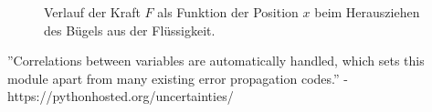 \documentclass[11pt,a4paper]{article}
\begin{document}
\begin{figure}[p]
\centering
{}
\caption{Verlauf der Kraft $F$ als Funktion der Position $x$ beim Herausziehen des B\"ugels aus der Fl\"ussigkeit.}
\label{ab4}
\end{figure}

\begin{thebibliography}{9}
''Correlations between variables are automatically handled, which sets this module apart from many existing error propagation codes.'' - https://pythonhosted.org/uncertainties/
\end{thebibliography}
\end{document}
